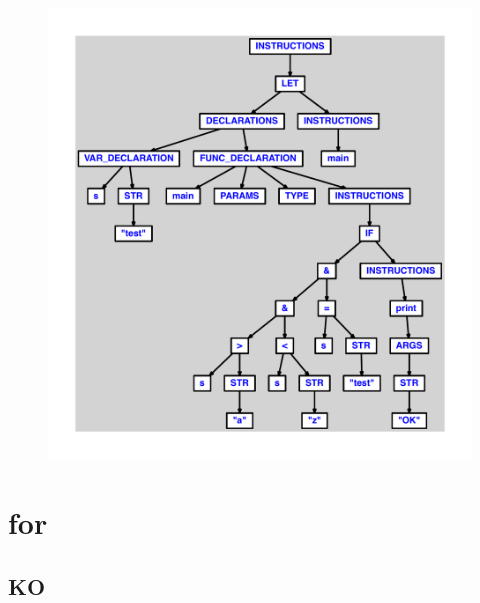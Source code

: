 \documentclass{article}
\begin{document}
\begin{figure}[H]\centering\includegraphics[max width=\textwidth]{ast/ast_182.pdf}\end{figure}\section{for}
\subsection{KO}
\end{document}
